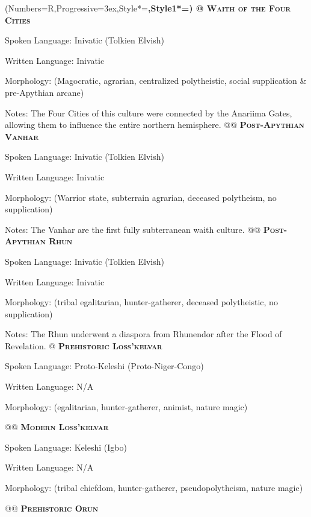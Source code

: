 \documentclass[12pt]{article}
\begin{document}
\begin{easylist}
	\NewList
	\ListProperties(Numbers=R,Progressive=3ex,Style*=\bf,Style1*=\Large\bf)
	@ \textsc{\textbf{ Waith of the Four Cities}}
	
	\normalfont Spoken Language: Inivatic (Tolkien Elvish)
	
	Written Language: Inivatic
	
	Morphology: (Magocratic, agrarian, centralized polytheistic, social supplication \& pre-Apythian arcane)
	
	{\footnotesize Notes: The Four Cities of this culture were connected by the Anariima Gates, allowing them to influence the entire northern hemisphere.}
	@@ \textsc{\textbf{Post-Apythian Vanhar}}
	
	\normalfont Spoken Language: Inivatic (Tolkien Elvish)
	
	Written Language: Inivatic
	
	Morphology: (Warrior state, subterrain agrarian, deceased polytheism, no supplication)
	
	{\footnotesize Notes: The Vanhar are the first fully subterranean waith culture.}
	@@ \textsc{\textbf{Post-Apythian Rhun}}
	
	\normalfont Spoken Language: Inivatic (Tolkien Elvish)
	
	Written Language: Inivatic
	
	Morphology: (tribal egalitarian, hunter-gatherer, deceased polytheistic, no supplication)
	
	{\footnotesize Notes: The Rhun underwent a diaspora from Rhunendor after the Flood of Revelation.}
	@ \textsc{\textbf{Prehistoric Loss'kelvar}}
	
	\normalfont Spoken Language: Proto-Keleshi (Proto-Niger-Congo)
	
	Written Language: N/A
	
	Morphology: (egalitarian, hunter-gatherer, animist, nature magic)
	
	@@ \textsc{\textbf{Modern Loss'kelvar}}
	
	\normalfont Spoken Language: Keleshi (Igbo)
	
	Written Language: N/A
	
	Morphology: (tribal chiefdom, hunter-gatherer, pseudopolytheism, nature magic)
	
	@@ \textsc{\textbf{Prehistoric Orun}}
	

\end{easylist}
\end{document}
